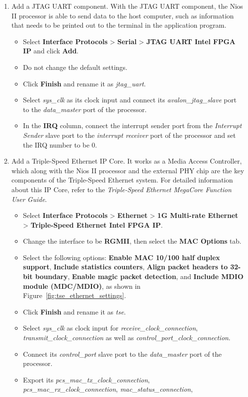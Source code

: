 \documentclass[11pt, twoside, pdftex]{article}
\begin{document}
\begin{enumerate}
	\item Add a JTAG UART component. With the JTAG UART component, the Nios II processor is able to send data to the host computer, such as information that needs to be printed out to the terminal in the application program.
		\begin{itemize}
			\item Select {\bf Interface Protocols} > {\bf Serial} > {\bf JTAG UART Intel FPGA IP} and click {\bf Add}.
			\item Do not change the default settings. 
			\item Click {\bf Finish} and rename it as {\it jtag\_uart}.
			\item Select {\it sys\_clk} as its clock input and connect its {\it avalon\_jtag\_slave} port to the {\it data\_master} port of the processor. 
			\item In the {\bf IRQ} column, connect the interrupt sender port from the {\it Interrupt Sender} slave port to the {\it interrupt receiver} port of the processor and set the IRQ number to be 0.
		\end{itemize}	
	
	\item Add a Triple-Speed Ethernet IP Core. It works as a Media Access Controller, which along with the Nios II processor and the external PHY chip are the key components of the Triple-Speed Ethernet system. For detailed information about this IP Core, refer to the {\it Triple-Speed Ethernet MegaCore Function User Guide}. 
		\begin{itemize}
			\item Select {\bf Interface Protocols} > {\bf Ethernet} > {\bf 1G Multi-rate Ethernet} > {\bf Triple-Speed Ethernet Intel FPGA IP}.
			\item Change the interface to be {\bf RGMII}, then select the {\bf MAC Options} tab.
			\item Select the following options: {\bf Enable MAC 10/100 half duplex support}, {\bf Include statistics counters}, {\bf Align packet headers to 32-bit boundary}, {\bf Enable magic packet detection}, and {\bf Include MDIO module (MDC/MDIO)}, as shown in Figure~\ref{fig:tse_ethernet_settings}. 
			\item Click {\bf Finish} and rename it as {\it tse}.
			\item Select {\it sys\_clk} as clock input for {\it receive\_clock\_connection}, {\it transmit\_clock\_connection} as well as {\it control\_port\_clock\_connection}. 
			\item Connect its {\it control\_port} slave port to the {\it data\_master} port of the processor.
			\item Export its {\it pcs\_mac\_tx\_clock\_connection}, {\it pcs\_mac\_rx\_clock\_connection}, {\it mac\_status\_connection}, 
			

\end{itemize}
\end{enumerate}
\end{document}
